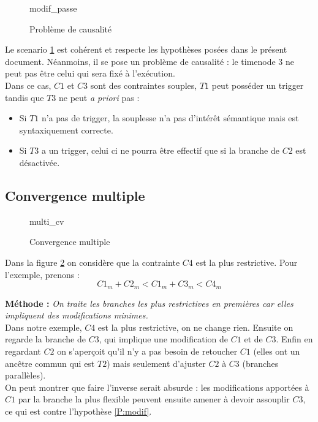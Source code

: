 \documentclass[10pt,a4paper]{article}
\newcommand{\hyporef}[1]{l'hypothèse \ref{#1}}
\begin{document}
	\begin{figure}[htp]
		\centering
		
		\schemaScenario modif_passe
		\caption{Problème de causalité}
		\label{S:modif_passe}
	\end{figure}

Le scenario \ref{S:modif_passe} est cohérent et respecte les hypothèses posées dans le présent document. Néanmoins, il se pose un problème de causalité : le timenode 3 ne peut pas être celui qui sera fixé à l'exécution. \\
Dans ce cas, $C1$ et $C3$ sont des contraintes souples, $T1$ peut posséder un trigger tandis que $T3$ ne peut \textit{a priori} pas :
	\begin{itemize}
		\item Si $T1$ n'a pas de trigger, la souplesse n'a pas d'intérêt sémantique mais est syntaxiquement correcte.
		\item Si $T3$ a un trigger, celui ci ne pourra être effectif que si la branche de $C2$ est désactivée.
	\end{itemize} 
	
	\subsection{Convergence multiple}

	\begin{figure}[htp]
		\centering
		
		\schemaScenario multi_cv
		\caption{Convergence multiple}
		\label{S:multi_cv}
	\end{figure}
Dans la figure \ref{S:multi_cv} on considère que la contrainte $C4$ est la plus restrictive. Pour l'exemple, prenons :
	\begin{equation}
	\label{E:cv:ordre}
		C1_m + C2_m < C1_m + C3_m < C4_m
	\end{equation}

	\textbf{Méthode :}
	\textit{On traite les branches les plus restrictives en premières car elles impliquent des modifications minimes.} \\
	
Dans notre exemple, $C4$ est la plus restrictive, on ne change rien. Ensuite on regarde la branche de $C3$, qui implique une modification de $C1$ et de $C3$. Enfin en regardant $C2$ on s'aperçoit qu'il n'y a pas besoin de retoucher $C1$ (elles ont un ancêtre commun qui est $T2$) mais seulement d'ajuster $C2$ à $C3$ (branches parallèles). \\
On peut montrer que faire l'inverse serait absurde : les modifications apportées à $C1$ par la branche la plus flexible peuvent ensuite amener à devoir assouplir $C3$, ce qui est contre \hyporef{P:modif}.\\
\end{document}
